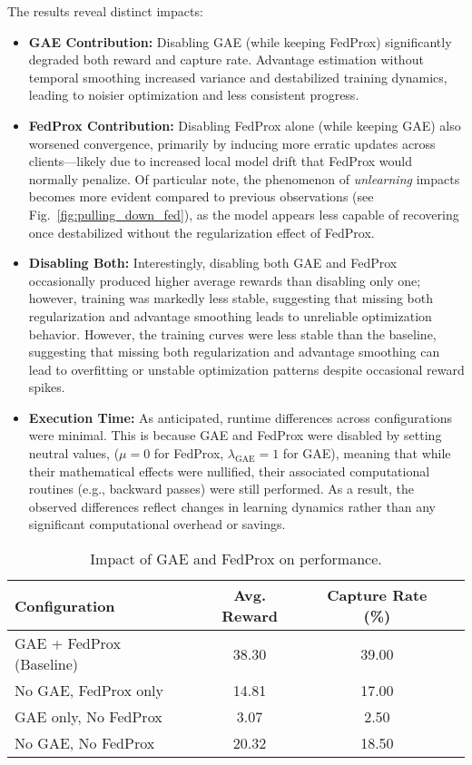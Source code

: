 \documentclass[12pt,a4paper,twoside,openany]{book}
\begin{document}
The results reveal distinct impacts:
\begin{itemize}
    \item \textbf{GAE Contribution:} Disabling GAE (while keeping FedProx) significantly degraded both reward and capture rate. Advantage estimation without temporal smoothing increased variance and destabilized training dynamics, leading to noisier optimization and less consistent progress.

    \item \textbf{FedProx Contribution:} Disabling FedProx alone (while keeping GAE) also worsened convergence, primarily by inducing more erratic updates across clients—likely due to increased local model drift that FedProx would normally penalize. Of particular note, the phenomenon of \emph{unlearning} impacts becomes more evident compared to previous observations (see Fig.~\ref{fig:pulling_down_fed}), as the model appears less capable of recovering once destabilized without the regularization effect of FedProx.

    \item \textbf{Disabling Both:} Interestingly, disabling both GAE and FedProx occasionally produced higher average rewards than disabling only one; however, training was markedly less stable, suggesting that missing both regularization and advantage smoothing leads to unreliable optimization behavior. However, the training curves were less stable than the baseline, suggesting that missing both regularization and advantage smoothing can lead to overfitting or unstable optimization patterns despite occasional reward spikes.

    \item \textbf{Execution Time:} As anticipated, runtime differences across configurations were minimal. This is because GAE and FedProx were disabled by setting neutral values, (\(\mu=0\) for FedProx, \(\lambda_{\text{GAE}}=1\) for GAE), meaning that while their mathematical effects were nullified, their associated computational routines (e.g., backward passes) were still performed. As a result, the observed differences reflect changes in learning dynamics rather than any significant computational overhead or savings.
\end{itemize}

\vspace{1em}
\begin{table}[H]
\centering
\small
\begin{tabular}{lccc}
\toprule
\textbf{Configuration} & \textbf{Avg. Reward} & \textbf{Capture Rate (\%)} \\
\midrule
GAE + FedProx (Baseline) & 38.30 & 39.00 \\
No GAE, FedProx only     & 14.81 & 17.00  \\
GAE only, No FedProx     & 3.07  & 2.50   \\
No GAE, No FedProx       & 20.32 & 18.50 \\
\bottomrule
  \end{tabular}
  \caption{Impact of GAE and FedProx on performance.}
  \label{tab:gae_fedprox}
\end{table}
\end{document}
